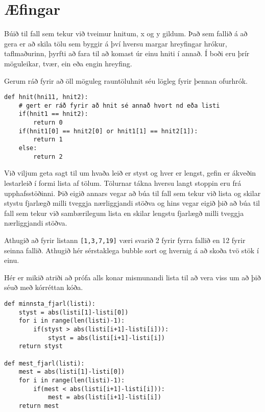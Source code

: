 \section{Æfingar}
\begin{exercise}\label{rei1}
Búið til fall sem tekur við tveimur hnitum, x og y gildum.
Það sem fallið á að gera er að skila tölu sem byggir á því hversu margar hreyfingar hrókur, taflmaðurinn, þyrfti að fara til að komast úr einu hniti í annað.
Í boði eru þrír möguleikar, tvær, ein eða engin hreyfing.

Gerum ráð fyrir að öll möguleg rauntöluhnit séu lögleg fyrir þennan ofurhrók.
\end{exercise}
\begin{Answer}[ref={rei1}]
	\begin{lstlisting}
def hnit(hni11, hnit2):
	# gert er ráð fyrir að hnit sé annað hvort nd eða listi
	if(hnit1 == hnit2):
		return 0
	if(hnit1[0] == hnit2[0] or hnit1[1] == hnit2[1]):
		return 1
	else:
		return 2\end{lstlisting}
\end{Answer}

\begin{exercise}\label{rei2}
Við viljum geta sagt til um hvaða leið er styst og hver er lengst, gefin er ákveðin lestarleið í formi lista af tölum.
Tölurnar tákna hversu langt stoppin eru frá upphafsstöðinni.
Þið eigið annars vegar að búa til fall sem tekur við lista og skilar stystu fjarlægð milli tveggja nærliggjandi stöðva og hins vegar eigið þið að búa til fall sem tekur við sambærilegum lista en skilar lengstu fjarlægð milli tveggja nærliggjandi stöðva.

Athugið að fyrir listann \texttt{[1,3,7,19]} væri svarið 2 fyrir fyrra fallið en 12 fyrir seinna fallið.
Athugið hér sérstaklega bubble sort og hvernig á að skoða tvö stök í einu.
\end{exercise}
\begin{Answer}[ref={rei2}]
Hér er mikið atriði að prófa alls konar mismunandi lista til að vera viss um að þið séuð með kórréttan kóða.
	\begin{lstlisting}
def minnsta_fjarl(listi):
	styst = abs(listi[1]-listi[0])
	for i in range(len(listi)-1):
		if(styst > abs(listi[i+1]-listi[i])):
			styst = abs(listi[i+1]-listi[i])
	return styst

def mest_fjarl(listi):
	mest = abs(listi[1]-listi[0])
	for i in range(len(listi)-1):
		if(mest < abs(listi[i+1]-listi[i])):
			mest = abs(listi[i+1]-listi[i])
	return mest

\end{lstlisting}
\end{Answer}

